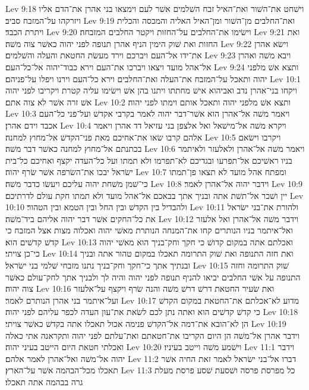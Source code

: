 Lev 9:18  וישׁחט את־השׁור ואת־האיל זבח השׁלמים אשׁר לעם וימצאו בני אהרן את־הדם אליו ויזרקהו על־המזבח סביב׃
Lev 9:19  ואת־החלבים מן־השׁור ומן־האיל האליה והמכסה והכלית ויתרת הכבד׃
Lev 9:20  וישׂימו את־החלבים על־החזות ויקטר החלבים המזבחה׃
Lev 9:21  ואת החזות ואת שׁוק הימין הניף אהרן תנופה לפני יהוה כאשׁר צוה משׁה׃
Lev 9:22  וישׂא אהרן את־ידו אל־העם ויברכם וירד מעשׂת החטאת והעלה והשׁלמים׃
Lev 9:23  ויבא משׁה ואהרן אל־אהל מועד ויצאו ויברכו את־העם וירא כבוד־יהוה אל־כל־העם׃
Lev 9:24  ותצא אשׁ מלפני יהוה ותאכל על־המזבח את־העלה ואת־החלבים וירא כל־העם וירנו ויפלו על־פניהם׃
Lev 10:1  ויקחו בני־אהרן נדב ואביהוא אישׁ מחתתו ויתנו בהן אשׁ וישׂימו עליה קטרת ויקריבו לפני יהוה אשׁ זרה אשׁר לא צוה אתם׃
Lev 10:2  ותצא אשׁ מלפני יהוה ותאכל אותם וימתו לפני יהוה׃
Lev 10:3  ויאמר משׁה אל־אהרן הוא אשׁר־דבר יהוה לאמר בקרבי אקדשׁ ועל־פני כל־העם אכבד וידם אהרן׃
Lev 10:4  ויקרא משׁה אל־מישׁאל ואל אלצפן בני עזיאל דד אהרן ויאמר אלהם קרבו שׂאו את־אחיכם מאת פני־הקדשׁ אל־מחוץ למחנה׃
Lev 10:5  ויקרבו וישׂאם בכתנתם אל־מחוץ למחנה כאשׁר דבר משׁה׃
Lev 10:6  ויאמר משׁה אל־אהרן ולאלעזר ולאיתמר בניו ראשׁיכם אל־תפרעו ובגדיכם לא־תפרמו ולא תמתו ועל כל־העדה יקצף ואחיכם כל־בית ישׂראל יבכו את־השׂרפה אשׁר שׂרף יהוה׃
Lev 10:7  ומפתח אהל מועד לא תצאו פן־תמתו כי־שׁמן משׁחת יהוה עליכם ויעשׂו כדבר משׁה׃
Lev 10:8  וידבר יהוה אל־אהרן לאמר׃
Lev 10:9  יין ושׁכר אל־תשׁת אתה ובניך אתך בבאכם אל־אהל מועד ולא תמתו חקת עולם לדרתיכם׃
Lev 10:10  ולהבדיל בין הקדשׁ ובין החל ובין הטמא ובין הטהור׃
Lev 10:11  ולהורת את־בני ישׂראל את כל־החקים אשׁר דבר יהוה אליהם ביד־משׁה׃
Lev 10:12  וידבר משׁה אל־אהרן ואל אלעזר ואל־איתמר בניו הנותרים קחו את־המנחה הנותרת מאשׁי יהוה ואכלוה מצות אצל המזבח כי קדשׁ קדשׁים הוא׃
Lev 10:13  ואכלתם אתה במקום קדושׁ כי חקך וחק־בניך הוא מאשׁי יהוה כי־כן צויתי׃
Lev 10:14  ואת חזה התנופה ואת שׁוק התרומה תאכלו במקום טהור אתה ובניך ובנתיך אתך כי־חקך וחק־בניך נתנו מזבחי שׁלמי בני ישׂראל׃
Lev 10:15  שׁוק התרומה וחזה התנופה על אשׁי החלבים יביאו להניף תנופה לפני יהוה והיה לך ולבניך אתך לחק־עולם כאשׁר צוה יהוה׃
Lev 10:16  ואת שׂעיר החטאת דרשׁ דרשׁ משׁה והנה שׂרף ויקצף על־אלעזר ועל־איתמר בני אהרן הנותרם לאמר׃
Lev 10:17  מדוע לא־אכלתם את־החטאת במקום הקדשׁ כי קדשׁ קדשׁים הוא ואתה נתן לכם לשׂאת את־עון העדה לכפר עליהם לפני יהוה׃
Lev 10:18  הן לא־הובא את־דמה אל־הקדשׁ פנימה אכול תאכלו אתה בקדשׁ כאשׁר צויתי׃
Lev 10:19  וידבר אהרן אל־משׁה הן היום הקריבו את־חטאתם ואת־עלתם לפני יהוה ותקראנה אתי כאלה ואכלתי חטאת היום הייטב בעיני יהוה׃
Lev 10:20  וישׁמע משׁה וייטב בעיניו׃
Lev 11:1  וידבר יהוה אל־משׁה ואל־אהרן לאמר אלהם׃
Lev 11:2  דברו אל־בני ישׂראל לאמר זאת החיה אשׁר תאכלו מכל־הבהמה אשׁר על־הארץ׃
Lev 11:3  כל מפרסת פרסה ושׁסעת שׁסע פרסת מעלת גרה בבהמה אתה תאכלו׃

